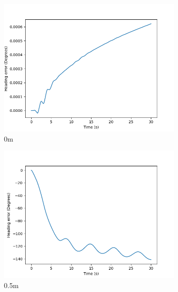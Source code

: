 \documentclass[class=article, crop=false]{standalone}
\begin{document}
\begin{figure}
    \centering
    \begin{subfigure}[b]{0.48\textwidth}
        \centering
        \includegraphics{scenario1/rov-100m/0.0m/usv_heading_error_uncontrolled}
        \caption{0m}
        \label{}
    \end{subfigure}
    \hfill
    \begin{subfigure}[b]{0.48\textwidth}
        \centering
        \includegraphics{scenario1/rov-100m/0.5m/usv_heading_error_uncontrolled}
        \caption{0.5m}
        \label{}
    \end{subfigure}
    \vfill
    \begin{subfigure}[b]{0.48\textwidth}
        \centering

\end{subfigure}
\end{figure}
\end{document}
